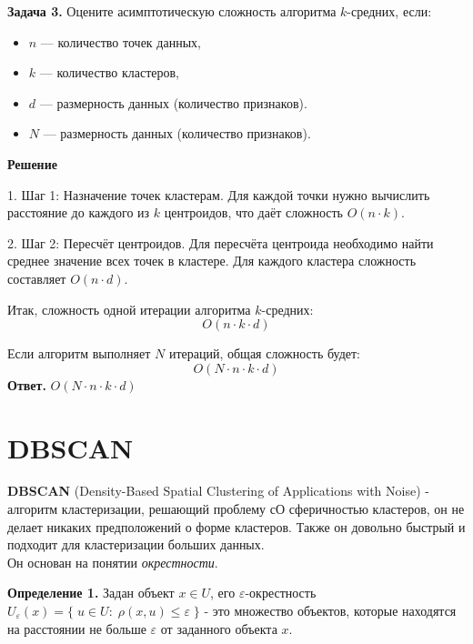 \textbf{Задача 3.}
Оцените асимптотическую сложность алгоритма \(k\)-средних, если:
\begin{itemize}
    \item \(n\) — количество точек данных,
    \item \(k\) — количество кластеров,
    \item \(d\) — размерность данных (количество признаков).
    \item \(N\) — размерность данных (количество признаков).
\end{itemize}

\textbf{Решение}

1. Шаг 1: Назначение точек кластерам.
Для каждой точки нужно вычислить расстояние до каждого из \(k\) центроидов, что даёт сложность \(O(n \cdot k)\).

2. Шаг 2: Пересчёт центроидов.
Для пересчёта центроида необходимо найти среднее значение всех точек в кластере. Для каждого кластера сложность составляет \(O(n \cdot d)\).

Итак, сложность одной итерации алгоритма \(k\)-средних: 
\[
    O(n \cdot k \cdot d)
\]

Если алгоритм выполняет \(N\) итераций, общая сложность будет:
\[
    O(N \cdot n \cdot k \cdot d)
\]
\textbf{Ответ.} $O(N \cdot n \cdot k \cdot d)$


\section{DBSCAN}

\textbf{DBSCAN} (Density-Based Spatial Clustering of Applications with Noise) - алгоритм кластеризации, решающий проблему сО сферичностью кластеров, он не делает никаких предположений о форме кластеров. Также он довольно быстрый и подходит для кластеризации больших данных.
\\
Он основан на понятии {\textit{окрестности}}.

\textbf{Определение 1.} Задан объект $x \in U$, его $\varepsilon$-окрестность $U_\varepsilon (x) = \{\;u\in U:\; \rho (x,u) \leq \varepsilon \;\}$ - это множество объектов, которые находятся на расстоянии не больше $\varepsilon$ от заданного объекта $x$.

\newcommand{\abs}[1]{\left|#1\right|}

